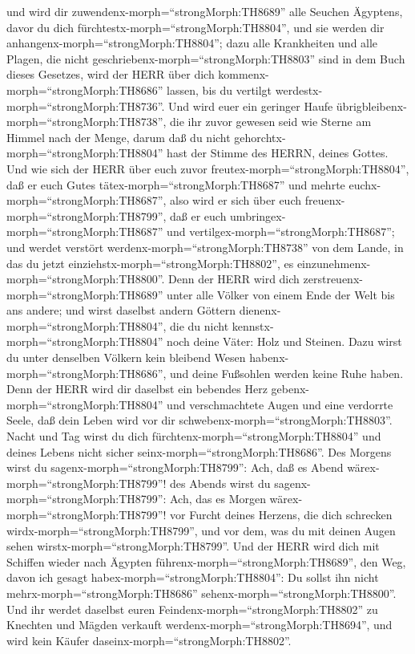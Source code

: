  und wird dir zuwendenx-morph=``strongMorph:TH8689'' alle
Seuchen Ägyptens, davor du dich fürchtestx-morph=``strongMorph:TH8804'',
und sie werden dir anhangenx-morph=``strongMorph:TH8804''; 
dazu alle Krankheiten und alle Plagen, die nicht
geschriebenx-morph=``strongMorph:TH8803'' sind in dem Buch dieses
Gesetzes, wird der HERR über dich kommenx-morph=``strongMorph:TH8686''
lassen, bis du vertilgt werdestx-morph=``strongMorph:TH8736''.
 Und wird euer ein geringer Haufe
übrigbleibenx-morph=``strongMorph:TH8738'', die ihr zuvor gewesen seid
wie Sterne am Himmel nach der Menge, darum daß du nicht
gehorchtx-morph=``strongMorph:TH8804'' hast der Stimme des HERRN, deines
Gottes.  Und wie sich der HERR über euch zuvor
freutex-morph=``strongMorph:TH8804'', daß er euch Gutes
tätex-morph=``strongMorph:TH8687'' und mehrte
euchx-morph=``strongMorph:TH8687'', also wird er sich über euch
freuenx-morph=``strongMorph:TH8799'', daß er euch
umbringex-morph=``strongMorph:TH8687'' und
vertilgex-morph=``strongMorph:TH8687''; und werdet verstört
werdenx-morph=``strongMorph:TH8738'' von dem Lande, in das du jetzt
einziehstx-morph=``strongMorph:TH8802'', es
einzunehmenx-morph=``strongMorph:TH8800''.  Denn der HERR
wird dich zerstreuenx-morph=``strongMorph:TH8689'' unter alle Völker von
einem Ende der Welt bis ans andere; und wirst daselbst andern Göttern
dienenx-morph=``strongMorph:TH8804'', die du nicht
kennstx-morph=``strongMorph:TH8804'' noch deine Väter: Holz und Steinen.
 Dazu wirst du unter denselben Völkern kein bleibend Wesen
habenx-morph=``strongMorph:TH8686'', und deine Fußsohlen werden keine
Ruhe haben. Denn der HERR wird dir daselbst ein bebendes Herz
gebenx-morph=``strongMorph:TH8804'' und verschmachtete Augen und eine
verdorrte Seele,  daß dein Leben wird vor dir
schwebenx-morph=``strongMorph:TH8803''. Nacht und Tag wirst du dich
fürchtenx-morph=``strongMorph:TH8804'' und deines Lebens nicht sicher
seinx-morph=``strongMorph:TH8686''.  Des Morgens wirst du
sagenx-morph=``strongMorph:TH8799'': Ach, daß es Abend
wärex-morph=``strongMorph:TH8799''! des Abends wirst du
sagenx-morph=``strongMorph:TH8799'': Ach, das es Morgen
wärex-morph=``strongMorph:TH8799''! vor Furcht deines Herzens, die dich
schrecken wirdx-morph=``strongMorph:TH8799'', und vor dem, was du mit
deinen Augen sehen wirstx-morph=``strongMorph:TH8799''. 
Und der HERR wird dich mit Schiffen wieder nach Ägypten
führenx-morph=``strongMorph:TH8689'', den Weg, davon ich gesagt
habex-morph=``strongMorph:TH8804'': Du sollst ihn nicht
mehrx-morph=``strongMorph:TH8686'' sehenx-morph=``strongMorph:TH8800''.
Und ihr werdet daselbst euren Feindenx-morph=``strongMorph:TH8802'' zu
Knechten und Mägden verkauft werdenx-morph=``strongMorph:TH8694'', und
wird kein Käufer daseinx-morph=``strongMorph:TH8802''.

